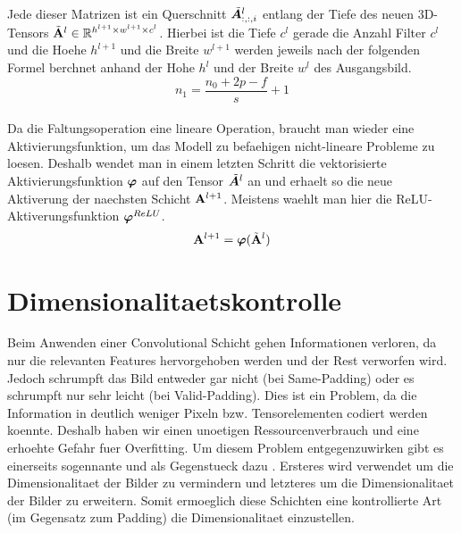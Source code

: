 \\
Jede dieser Matrizen ist ein Querschnitt $\tilde{\bm{A}}^l_{:,:,i}$ entlang der
Tiefe des neuen 3D-Tensors $\tilde{\mathbf{A}}^l \in \mathbb{R}^{h^{l+1} \times w^{l+1} \times c^l}$.
Hierbei ist die Tiefe $c^l$ gerade die Anzahl Filter $c^l$ und die Hoehe
$h^{l+1}$ und die Breite $w^{l+1}$ werden jeweils nach der folgenden Formel
berchnet anhand der Hohe $h^l$ und der Breite $w^l$ des Ausgangsbild.
\\
\begin{equation}
  n_1 = \frac{n_0 + 2p - f}{s} + 1
\end{equation}
\\
Da die Faltungsoperation eine lineare Operation, braucht man wieder eine
Aktivierungsfunktion, um das Modell zu befaehigen nicht-lineare Probleme zu
loesen.
Deshalb wendet man in einem letzten Schritt die vektorisierte Aktivierungsfunktion
$\bm{\varphi}$ auf den Tensor $\tilde{\bm{A}}^l$ an und erhaelt so die
neue Aktiverung der naechsten Schicht $\mathbf{A}^{l+1}$. Meistens waehlt man hier
die ReLU-Aktiverungsfunktion $\bm{\varphi}^{ReLU}$.
\begin{equation}
  \mathbf{A}^{l+1} = \bm{\varphi}(\tilde{\mathbf{A}}^l)
\end{equation}



\cite{Goodfellow-et-al-2016}

\section{Dimensionalitaetskontrolle}
Beim Anwenden einer Convolutional Schicht gehen Informationen verloren, da nur
die relevanten Features hervorgehoben werden und der Rest verworfen wird. Jedoch
schrumpft das Bild entweder gar nicht (bei Same-Padding) oder es schrumpft nur
sehr leicht (bei Valid-Padding). Dies ist ein Problem, da die Information in
deutlich weniger Pixeln bzw. Tensorelementen codiert werden koennte. Deshalb
haben wir einen unoetigen Ressourcenverbrauch und eine erhoehte Gefahr fuer
Overfitting. Um diesem Problem entgegenzuwirken gibt es einerseits sogennante
 und als Gegenstueck dazu
. Ersteres wird verwendet um die Dimensionalitaet
der Bilder zu vermindern und letzteres um die Dimensionalitaet der Bilder zu
erweitern. Somit ermoeglich diese Schichten eine kontrollierte Art (im Gegensatz zum
Padding) die Dimensionalitaet einzustellen.

